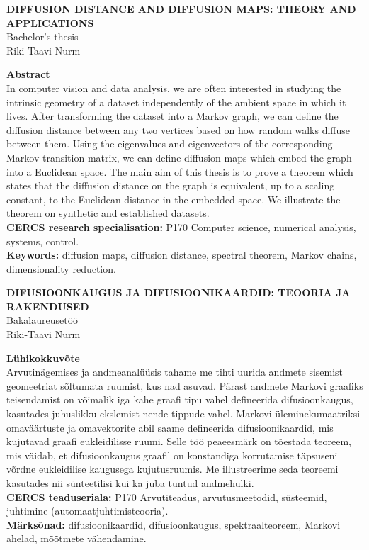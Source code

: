 \small{

\begin{center}
\MakeUppercase{\textbf{Diffusion distance and diffusion maps: theory and applications}}\\
Bachelor's thesis \\
Riki-Taavi Nurm\\
\end{center}

\normalsize{\textbf{Abstract}}\\
In computer vision and data analysis, we are often interested in studying the intrinsic geometry of a dataset independently of the ambient space in which it lives. After transforming the dataset into a Markov graph, we can define the diffusion distance between any two vertices based on how random walks diffuse between them. Using the eigenvalues and eigenvectors of the corresponding Markov transition matrix, we can define diffusion maps which embed the graph into a Euclidean space. The main aim of this thesis is to prove a theorem which states that the diffusion distance on the graph is equivalent, up to a scaling constant, to the Euclidean distance in the embedded space. We illustrate the theorem on synthetic and established datasets. \\
\textbf{CERCS research specialisation:} P170 Computer science, numerical analysis, systems, control.\\
\textbf{Keywords:} diffusion maps, diffusion distance, spectral theorem, Markov chains, dimensionality reduction.\\
}
\vspace{0.5cm}
\small{

\begin{center}
\MakeUppercase{\textbf{difusioonkaugus ja difusioonikaardid: teooria ja rakendused}}\\
Bakalaureusetöö \\
Riki-Taavi Nurm\\
\end{center}

\normalsize{\textbf{Lühikokkuvõte}}\\
Arvutinägemises ja andmeanalüüsis tahame me tihti uurida andmete sisemist geomeetriat sõltumata ruumist, kus nad asuvad. Pärast andmete Markovi graafiks teisendamist on võimalik iga kahe graafi tipu vahel defineerida difusioonkaugus, kasutades juhuslikku ekslemist nende tippude vahel. Markovi üleminekumaatriksi omaväärtuste ja omavektorite abil saame defineerida difusioonikaardid, mis kujutavad graafi eukleidilisse ruumi. Selle töö peaeesmärk on tõestada teoreem, mis väidab, et difusioonkaugus graafil on konstandiga korrutamise täpsuseni võrdne eukleidilise kaugusega kujutusruumis. Me illustreerime seda teoreemi kasutades nii sünteetilisi kui ka juba tuntud andmehulki.\\
\textbf{CERCS teaduseriala:} P170 Arvutiteadus, arvutusmeetodid, süsteemid, juhtimine
(automaatjuhtimisteooria).\\
\textbf{Märksõnad:} difusioonikaardid, difusioonkaugus, spektraalteoreem, Markovi ahelad, mõõtmete vähendamine.\\
}